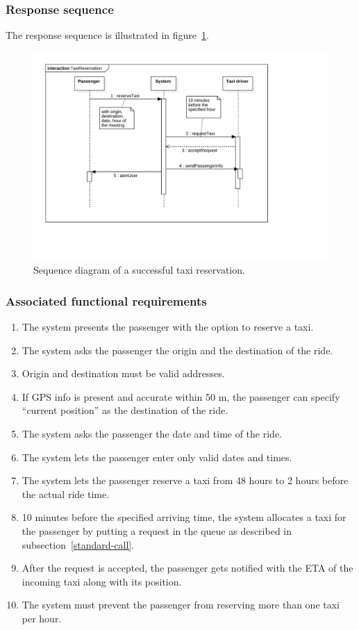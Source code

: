 \subsubsection{Response sequence}
The response sequence is illustrated in figure~\ref{fig:sequence-taxireservation}.
\begin{figure}
	\includegraphics[width=\textwidth]{diagrams/sequence_taxireservation.pdf}
	\caption{Sequence diagram of a successful taxi reservation.}
	\label{fig:sequence-taxireservation}
\end{figure}

\subsubsection{Associated functional requirements}
\begin{enumerate}
	\item The system presents the passenger with the option to reserve a taxi.
	\item The system asks the passenger the origin and the destination of the ride.
	\item Origin and destination must be valid addresses.
	\item If GPS info is present and accurate within 50 m, the passenger can specify ``current position'' as the destination of the ride.
	\item The system asks the passenger the date and time of the ride.
	\item The system lets the passenger enter only valid dates and times.
	\item The system lets the passenger reserve a taxi from 48 hours to 2 hours before the actual ride time.
	\item 10 minutes before the specified arriving time, the system allocates a taxi for the passenger by putting a request in the queue as described in subsection~\ref{standard-call}.
	\item After the request is accepted, the passenger gets notified with the ETA of the incoming taxi along with its position.
	\item The system must prevent the passenger from reserving more than one taxi per hour.
\end{enumerate}
